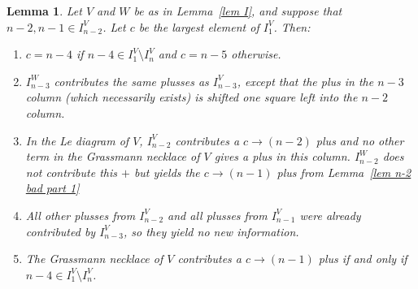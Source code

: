 \documentclass[11pt]{article}
\newtheorem{lem}[thm]{Lemma}
\theoremstyle{remark}
\theoremstyle{definition}
\begin{document}
  \begin{lem}\label{lem n-2 bad part 2}
    Let $V$ and $W$ be as in Lemma~\ref{lem I}, and suppose that $n-2,n-1 \in I_{n-2}^{V}$. Let $c$ be the largest element of $I_1^V$.  Then:
    \begin{enumerate}
  \item $c=n-4$ if $n-4\in I_1^V\setminus I_n^V$ and $c=n-5$ otherwise.
  \item $I_{n-3}^W$ contributes the same plusses as $I_{n-3}^V$, except that the plus in the $n-3$ column (which necessarily exists) is shifted one square left into the $n-2$ column.
  \item In the Le diagram of $V$, $I_{n-2}^{V}$ contributes a $c\rightarrow (n-2)$ plus and no other term in the Grassmann necklace of $V$ gives a plus in this column.  $I_{n-2}^W$ does not contribute this $+$ but yields the $c\rightarrow (n-1)$ plus from Lemma~\ref{lem n-2 bad part 1}
  \item All other plusses from $I_{n-2}^{V}$ and all plusses from $I_{n-1}^V$ were already contributed by $I_{n-3}^V$, so they yield no new information.
  \item The Grassmann necklace of $V$ contributes a $c\rightarrow (n-1)$ plus if and only if $n-4\in I_1^V\setminus I_n^V$.
  \end{enumerate} 
\end{lem}
\end{document}
